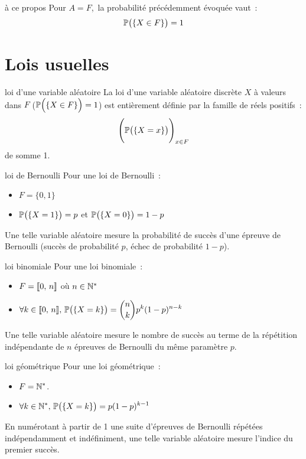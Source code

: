\begin{remarque}{}{à ce propos}
    Pour $A = F$,\, la probabilité précédemment évoquée vaut~:
    $$\mathbb{P}\big(\{X \in F\}\big) = 1$$
\end{remarque}
\section{Lois usuelles}

\begin{definition}{}{loi d'une variable aléatoire}
    La loi d'une variable aléatoire discrète $X$ à valeurs dans $F$ (\ie $\mathbb{P}\Big(\{X \in F\}\Big)=1$) est entièrement définie par la famille de réels positifs~:
    $$\Bigg(\mathbb{P}\big(\{X = x\}\big)\Bigg)_{x \in F}$$
    de somme 1.
\end{definition}

\begin{exemple}{}{loi de Bernoulli}
    Pour une loi de Bernoulli~:
    \begin{itemize}
        \item $\displaystyle F = \{0, 1\}$
        \item $\displaystyle \mathbb{P}\big(\{X = 1\}\big) = p$ et $\mathbb{P}\big(\{X = 0\}\big) = 1-p$
    \end{itemize}
    Une telle variable aléatoire mesure la probabilité de succès d'une épreuve de Bernoulli (succès de probabilité $p$, échec de probabilité $1-p$).
\end{exemple}

\begin{exemple}{}{loi binomiale}
    Pour une loi binomiale~:
    \begin{itemize}
        \item $\displaystyle F = \llbracket 0 ,\, n \rrbracket$ où $n \in \mathbb{N}^*$
        \item $\displaystyle \forall k \in \llbracket 0 ,\, n \rrbracket,\, \mathbb{P}\big(\{X = k\}\big) = \binom{n}{k}p^k(1-p)^{n-k}$
    \end{itemize}
    Une telle variable aléatoire mesure le nombre de succès au terme de la répétition indépendante de $n$ épreuves de Bernoulli du même paramètre $p$.
\end{exemple}

\begin{exemple}{}{loi géométrique}
    Pour une loi géométrique~:
    \begin{itemize}
        \item $\displaystyle F = \mathbb{N}^*$.
        \item $\displaystyle \forall k \in \mathbb{N}^*,\, \mathbb{P}\big(\{X = k\}\big) = p (1-p)^{k-1}$
    \end{itemize}
    En numérotant à partir de 1 une suite d'épreuves de Bernoulli répétées indépendamment et indéfiniment, une telle variable aléatoire mesure l'indice du premier succès. 
\end{exemple}


